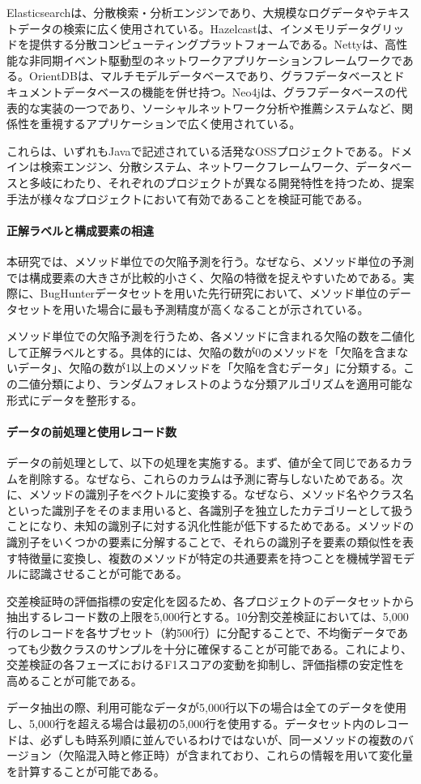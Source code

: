 Elasticsearchは、分散検索・分析エンジンであり、大規模なログデータやテキストデータの検索に広く使用されている。Hazelcastは、インメモリデータグリッドを提供する分散コンピューティングプラットフォームである。Nettyは、高性能な非同期イベント駆動型のネットワークアプリケーションフレームワークである。OrientDBは、マルチモデルデータベースであり、グラフデータベースとドキュメントデータベースの機能を併せ持つ。Neo4jは、グラフデータベースの代表的な実装の一つであり、ソーシャルネットワーク分析や推薦システムなど、関係性を重視するアプリケーションで広く使用されている。

これらは、いずれもJavaで記述されている活発なOSSプロジェクトである。ドメインは検索エンジン、分散システム、ネットワークフレームワーク、データベースと多岐にわたり、それぞれのプロジェクトが異なる開発特性を持つため、提案手法が様々なプロジェクトにおいて有効であることを検証可能である。

\paragraph{正解ラベルと構成要素の相違}
本研究では、メソッド単位での欠陥予測を行う。なぜなら、メソッド単位の予測では構成要素の大きさが比較的小さく、欠陥の特徴を捉えやすいためである。実際に、BugHunterデータセットを用いた先行研究において、メソッド単位のデータセットを用いた場合に最も予測精度が高くなることが示されている。

メソッド単位での欠陥予測を行うため、各メソッドに含まれる欠陥の数を二値化して正解ラベルとする。具体的には、欠陥の数が0のメソッドを「欠陥を含まないデータ」、欠陥の数が1以上のメソッドを「欠陥を含むデータ」に分類する。この二値分類により、ランダムフォレストのような分類アルゴリズムを適用可能な形式にデータを整形する。

\paragraph{データの前処理と使用レコード数}
データの前処理として、以下の処理を実施する。まず、値が全て同じであるカラムを削除する。なぜなら、これらのカラムは予測に寄与しないためである。次に、メソッドの識別子をベクトルに変換する。なぜなら、メソッド名やクラス名といった識別子をそのまま用いると、各識別子を独立したカテゴリーとして扱うことになり、未知の識別子に対する汎化性能が低下するためである。メソッドの識別子をいくつかの要素に分解することで、それらの識別子を要素の類似性を表す特徴量に変換し、複数のメソッドが特定の共通要素を持つことを機械学習モデルに認識させることが可能である。

交差検証時の評価指標の安定化を図るため、各プロジェクトのデータセットから抽出するレコード数の上限を5,000行とする。10分割交差検証においては、5,000行のレコードを各サブセット（約500行）に分配することで、不均衡データであっても少数クラスのサンプルを十分に確保することが可能である。これにより、交差検証の各フェーズにおけるF1スコアの変動を抑制し、評価指標の安定性を高めることが可能である。

データ抽出の際、利用可能なデータが5,000行以下の場合は全てのデータを使用し、5,000行を超える場合は最初の5,000行を使用する。データセット内のレコードは、必ずしも時系列順に並んでいるわけではないが、同一メソッドの複数のバージョン（欠陥混入時と修正時）が含まれており、これらの情報を用いて変化量を計算することが可能である。